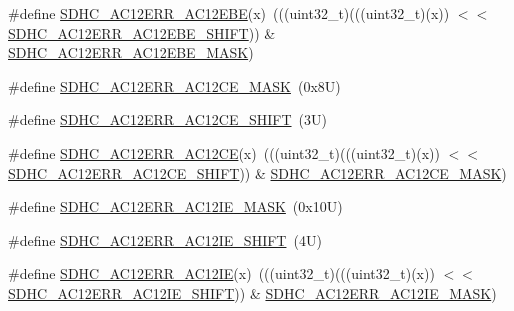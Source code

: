 \begin{DoxyCompactItemize}
\#define \mbox{\hyperlink{group___s_d_h_c___register___masks_ga3d02d0ddd92de7868bc4c37577ba2848}{S\+D\+H\+C\+\_\+\+A\+C12\+E\+R\+R\+\_\+\+A\+C12\+E\+BE}}(x)~(((uint32\+\_\+t)(((uint32\+\_\+t)(x)) $<$$<$ \mbox{\hyperlink{group___s_d_h_c___register___masks_gaa4872fca1b2f1ae350fcb6297e995469}{S\+D\+H\+C\+\_\+\+A\+C12\+E\+R\+R\+\_\+\+A\+C12\+E\+B\+E\+\_\+\+S\+H\+I\+FT}})) \& \mbox{\hyperlink{group___s_d_h_c___register___masks_ga20a7d6558b259a61499a0745f6450798}{S\+D\+H\+C\+\_\+\+A\+C12\+E\+R\+R\+\_\+\+A\+C12\+E\+B\+E\+\_\+\+M\+A\+SK}})
\item 
\#define \mbox{\hyperlink{group___s_d_h_c___register___masks_gabefbec3e963ccb70de1fdc5b0bb06c14}{S\+D\+H\+C\+\_\+\+A\+C12\+E\+R\+R\+\_\+\+A\+C12\+C\+E\+\_\+\+M\+A\+SK}}~(0x8\+U)
\item 
\#define \mbox{\hyperlink{group___s_d_h_c___register___masks_ga7b92a5f04788ce2cc5634ebf7f604a9b}{S\+D\+H\+C\+\_\+\+A\+C12\+E\+R\+R\+\_\+\+A\+C12\+C\+E\+\_\+\+S\+H\+I\+FT}}~(3\+U)
\item 
\#define \mbox{\hyperlink{group___s_d_h_c___register___masks_gae27971258a21b5c12f793cae6c105ddf}{S\+D\+H\+C\+\_\+\+A\+C12\+E\+R\+R\+\_\+\+A\+C12\+CE}}(x)~(((uint32\+\_\+t)(((uint32\+\_\+t)(x)) $<$$<$ \mbox{\hyperlink{group___s_d_h_c___register___masks_ga7b92a5f04788ce2cc5634ebf7f604a9b}{S\+D\+H\+C\+\_\+\+A\+C12\+E\+R\+R\+\_\+\+A\+C12\+C\+E\+\_\+\+S\+H\+I\+FT}})) \& \mbox{\hyperlink{group___s_d_h_c___register___masks_gabefbec3e963ccb70de1fdc5b0bb06c14}{S\+D\+H\+C\+\_\+\+A\+C12\+E\+R\+R\+\_\+\+A\+C12\+C\+E\+\_\+\+M\+A\+SK}})
\item 
\#define \mbox{\hyperlink{group___s_d_h_c___register___masks_ga83739f9ba43d7cded35950a1e98d2caa}{S\+D\+H\+C\+\_\+\+A\+C12\+E\+R\+R\+\_\+\+A\+C12\+I\+E\+\_\+\+M\+A\+SK}}~(0x10\+U)
\item 
\#define \mbox{\hyperlink{group___s_d_h_c___register___masks_ga3bd5a3ae0633a0ab02becdb7422fa910}{S\+D\+H\+C\+\_\+\+A\+C12\+E\+R\+R\+\_\+\+A\+C12\+I\+E\+\_\+\+S\+H\+I\+FT}}~(4\+U)
\item 
\#define \mbox{\hyperlink{group___s_d_h_c___register___masks_ga9e57de532eef88d389aae0d5bb9be558}{S\+D\+H\+C\+\_\+\+A\+C12\+E\+R\+R\+\_\+\+A\+C12\+IE}}(x)~(((uint32\+\_\+t)(((uint32\+\_\+t)(x)) $<$$<$ \mbox{\hyperlink{group___s_d_h_c___register___masks_ga3bd5a3ae0633a0ab02becdb7422fa910}{S\+D\+H\+C\+\_\+\+A\+C12\+E\+R\+R\+\_\+\+A\+C12\+I\+E\+\_\+\+S\+H\+I\+FT}})) \& \mbox{\hyperlink{group___s_d_h_c___register___masks_ga83739f9ba43d7cded35950a1e98d2caa}{S\+D\+H\+C\+\_\+\+A\+C12\+E\+R\+R\+\_\+\+A\+C12\+I\+E\+\_\+\+M\+A\+SK}})
\item 
$$
\end{DoxyCompactItemize}
